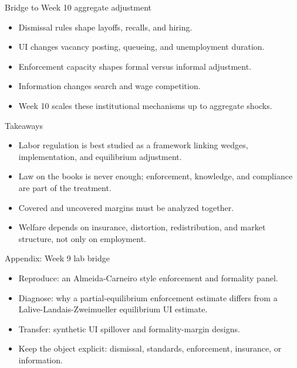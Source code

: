 \documentclass[aspectratio=169,11pt]{beamer}
\begin{document}
\begin{frame}{Bridge to Week 10 aggregate adjustment}
\begin{itemize}
    \item Dismissal rules shape layoffs, recalls, and hiring.
    \item UI changes vacancy posting, queueing, and unemployment duration.
    \item Enforcement capacity shapes formal versus informal adjustment.
    \item Information changes search and wage competition.
    \item Week 10 scales these institutional mechanisms up to aggregate shocks.
\end{itemize}
\end{frame}

\begin{frame}{Takeaways}
\begin{itemize}
    \item Labor regulation is best studied as a framework linking wedges, implementation, and equilibrium adjustment.
    \item Law on the books is never enough; enforcement, knowledge, and compliance are part of the treatment.
    \item Covered and uncovered margins must be analyzed together.
    \item Welfare depends on insurance, distortion, redistribution, and market structure, not only on employment.
\end{itemize}
\end{frame}

\appendix

\begin{frame}{Appendix: Week 9 lab bridge}
\begin{itemize}
    \item Reproduce: an Almeida-Carneiro style enforcement and formality panel.
    \item Diagnose: why a partial-equilibrium enforcement estimate differs from a Lalive-Landais-Zweimueller equilibrium UI estimate.
    \item Transfer: synthetic UI spillover and formality-margin designs.
    \item Keep the object explicit: dismissal, standards, enforcement, insurance, or information.
\end{itemize}
\end{frame}
\end{document}
